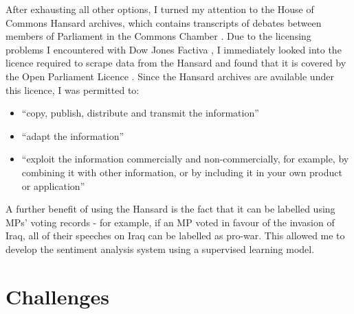 \documentclass[12pt,a4paper,twoside,openright]{report}
\begin{document}
After exhausting all other options, I turned my attention to the House of Commons Hansard archives, which contains transcripts of debates between members of Parliament in the Commons Chamber \cite{hansard}. Due to the licensing problems I encountered with Dow Jones Factiva \cite{factiva}, I immediately looked into the licence required to scrape data from the Hansard and found that it is covered by the Open Parliament Licence \cite{open_parliament_licence}. Since the Hansard archives are available under this licence, I was permitted to:
\begin{itemize}
	\item ``copy, publish, distribute and transmit the information''
	\item ``adapt the information''
	\item ``exploit the information commercially and non-commercially, for example, by combining it with other information, or by including it in your own product or application''
\end{itemize}

A further benefit of using the Hansard is the fact that it can be labelled using MPs' voting records - for example, if an MP voted in favour of the invasion of Iraq, all of their speeches on Iraq can be labelled as pro-war. This allowed me to develop the sentiment analysis system using a supervised learning model.

\section{Challenges} \label{intro-challenges}
\end{document}
